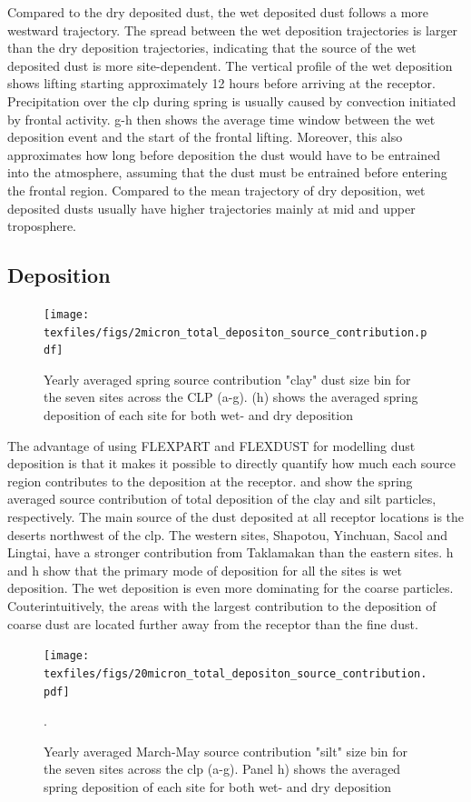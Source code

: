 Compared to the dry deposited dust, the wet deposited dust follows a more westward trajectory.
The spread between the wet deposition trajectories is larger than the dry deposition trajectories, indicating that the source of the wet deposited dust is more site-dependent.
The vertical profile of the wet deposition shows lifting starting approximately 12 hours before arriving at the receptor. 
Precipitation over the \acrshort{clp} during spring is usually caused by convection initiated by frontal activity. g-h then shows the average time window between the wet deposition event and the start of the frontal lifting. Moreover, this also approximates how long before deposition the dust would have to be entrained into the atmosphere, assuming that the dust must be entrained before entering the frontal region. Compared to the mean trajectory of dry deposition, wet deposited dusts usually have higher trajectories mainly at mid and upper troposphere.
\subsection{Deposition}
\begin{figure}[htbp]
    \centering
    \texttt{[image: texfiles/figs/2micron\_total\_depositon\_source\_contribution.pdf]}
    \caption{Yearly averaged spring source contribution "clay" dust size bin for the seven sites across the CLP (a-g). (h) shows the averaged spring deposition of each site for both wet- and dry deposition}
    \label{fig:source_contrib_2mmu}
\end{figure}

The advantage of using FLEXPART and FLEXDUST for modelling dust deposition is that it makes it possible to directly quantify how much each source region contributes to the deposition at the receptor.   
 and  show the spring averaged source contribution of total deposition of the clay and silt particles, respectively. 
The main source of the dust deposited at all receptor locations is the  deserts northwest of the \acrshort{clp}. 
The western sites, Shapotou, Yinchuan, Sacol and Lingtai, have a stronger contribution from Taklamakan than the eastern sites. 
h and h show that the primary mode of deposition for all the sites is wet deposition.
The wet deposition is even more dominating for the coarse particles. 
Couterintuitively, the areas with the largest contribution to the deposition of coarse dust are located further away from the receptor than the fine dust.
 \begin{figure}[htbp]
    \centering
    \texttt{[image: texfiles/figs/20micron\_total\_depositon\_source\_contribution.pdf]}
    \caption{Yearly averaged March-May source contribution "silt" size bin for the seven sites across the \acrshort{clp} (a-g). Panel h) shows the averaged spring deposition of each site for both wet- and dry deposition}.
    \label{fig:source_contrib_20mmu}
\end{figure}

